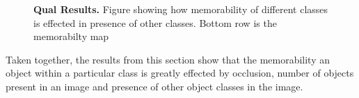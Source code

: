 \begin{figure}[h]
\vspace{-5mm}\caption{\footnotesize\textbf{Qual Results.} Figure showing how memorability of different classes is effected in presence of other classes. Bottom row is the memorabilty map}\label{fig:qualInterClass}
\end{figure}

Taken together, the results from this section show that the memorability an object within a particular class is greatly effected by occlusion, number of objects present in an image and presence of other object classes in the image.  